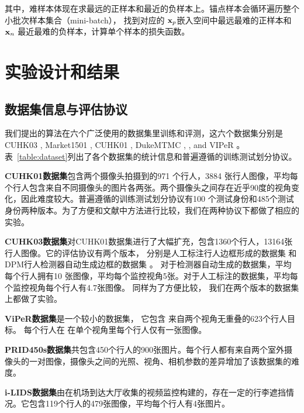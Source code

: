 其中，难样本体现在求最远的正样本和最近的负样本上。锚点样本会循环遍历整个小批次样本集合（mini-batch），
找到对应的 ${\mathbf{x}}_p$嵌入空间中最远最难的正样本和 ${\mathbf{x}}_n$ 最近最难的负样本，计算单个样本的损失函数。

\section{实验设计和结果}

\subsection{数据集信息与评估协议}

我们提出的算法在六个广泛使用的数据集里训练和评测，这六个数据集分别是CUHK03 \cite{li2014deepreid}, Market1501 \cite{zheng2015scalable},  CUHK01 \cite{li2013locally}, DukeMTMC \cite{zheng2017unlabeled}, \cite{ristani2016MTMC} , and VIPeR \cite{gray2007evaluating}。
表~\ref{table:dataset}列出了各个数据集的统计信息和普遍遵循的训练测试划分协议。

\textbf{CUHK01数据集}包含两个摄像头拍摄到的971 个行人，3884 张行人图像，平均每个行人包含来自不同摄像头的图片各两张。两个摄像头之间存在近乎90度的视角变化，因此难度较大。普遍遵循的训练测试划分协议有100 个测试身份和485个测试身份两种版本。为了方便和文献中方法进行比较，我们在两种协议下都做了相应的实验。

\textbf{CUHK03数据集}对CUHK01数据集进行了大幅扩充，包含1360个行人，13164张行人图像。它的评估协议有两个版本，
	分别是人工标注行人边框形成的数据集
	和DPM行人检测器自动生成边框的数据集
	。
对于检测器自动生成的数据集，平均每个行人拥有10 张图像，平均每个监控视角5张。对于人工标注的数据集，平均每个监控视角每个行人有4.7张图像。
	同样为了方便比较，
	我们在两个版本的数据集上都做了实验。

\textbf{ViPeR数据集}是一个较小的数据集，
	它包含
	来自两个视角无重叠的623个行人目标。
	每个行人在
	在单个视角里每个行人仅有一张图像。

\textbf{PRID450s数据集}共包含450个行人的900张图片。每个行人都有来自两个室外摄像头的一对图像，摄像头之间的光照、视角、相机参数的差异增加了该数据集的难度。

\textbf{i-LIDS数据集}由在机场到达大厅收集的视频监控构建的，存在一定的行李遮挡情况。它包含119个行人的479张图像，平均每个行人有4张图片。

